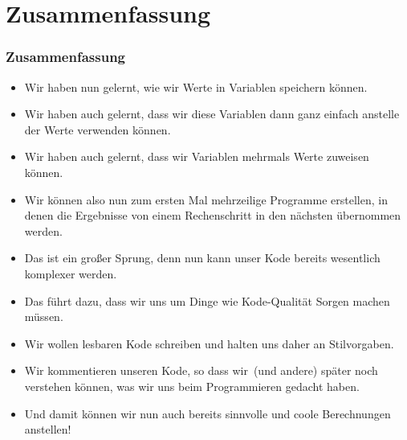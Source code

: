 \documentclass[aspectratio=169,mathserif,notheorems]{beamer}%
\begin{document}
\section{Zusammenfassung}%
%
\begin{frame}%
\frametitle{Zusammenfassung}%
\begin{itemize}%
\item Wir haben nun gelernt, wie wir Werte in Variablen speichern können.%
\item<2-> Wir haben auch gelernt, dass wir diese Variablen dann ganz einfach anstelle der Werte verwenden können.%
\item<3-> Wir haben auch gelernt, dass wir Variablen mehrmals Werte zuweisen können.%
\item<4-> Wir können also nun zum ersten Mal mehrzeilige Programme erstellen, in denen die Ergebnisse von einem Rechenschritt in den nächsten übernommen werden.%
\item<5-> Das ist ein großer Sprung, denn nun kann unser Kode bereits wesentlich komplexer werden.%
\item<6-> Das führt dazu, dass wir uns um Dinge wie Kode-Qualität Sorgen machen müssen.%
\item<7-> Wir wollen lesbaren Kode schreiben und halten uns daher an Stilvorgaben.%
\item<8-> Wir kommentieren unseren Kode, so dass wir~(und andere) später noch verstehen können, was wir uns beim Programmieren gedacht haben.%
\item<9-> Und damit können wir nun auch bereits sinnvolle und coole Berechnungen anstellen!%
\end{itemize}%
\end{frame}%
%
\endPresentation%
\end{document}
